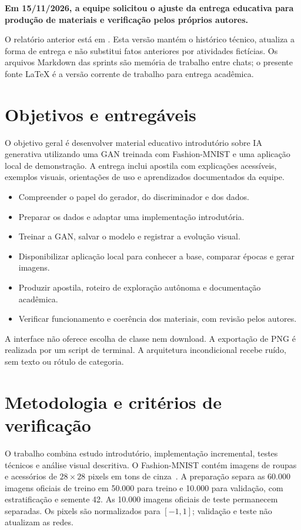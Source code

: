 \documentclass[12pt,a4paper]{article}
\begin{document}
\textbf{Em 15/11/2026, a equipe solicitou o ajuste da entrega educativa para produção de materiais e verificação pelos próprios autores.}

O relatório anterior está em . Esta versão mantém o histórico técnico, atualiza a forma de entrega e não substitui fatos anteriores por atividades fictícias. Os arquivos Markdown das sprints são memória de trabalho entre chats; o presente fonte LaTeX é a versão corrente de trabalho para entrega acadêmica.

\section{Objetivos e entregáveis}
O objetivo geral é desenvolver material educativo introdutório sobre IA generativa utilizando uma GAN treinada com Fashion-MNIST e uma aplicação local de demonstração. A entrega inclui apostila com explicações acessíveis, exemplos visuais, orientações de uso e aprendizados documentados da equipe.
\begin{itemize}
\item Compreender o papel do gerador, do discriminador e dos dados.
\item Preparar os dados e adaptar uma implementação introdutória.
\item Treinar a GAN, salvar o modelo e registrar a evolução visual.
\item Disponibilizar aplicação local para conhecer a base, comparar épocas e gerar imagens.
\item Produzir apostila, roteiro de exploração autônoma e documentação acadêmica.
\item Verificar funcionamento e coerência dos materiais, com revisão pelos autores.
\end{itemize}
A interface não oferece escolha de classe nem download. A exportação de PNG é realizada por um script de terminal. A arquitetura incondicional recebe ruído, sem texto ou rótulo de categoria.

\section{Metodologia e critérios de verificação}
O trabalho combina estudo introdutório, implementação incremental, testes técnicos e análise visual descritiva. O Fashion-MNIST contém imagens de roupas e acessórios de $28\times28$ pixels em tons de cinza~\cite{fashionmnist}. A preparação separa as 60.000 imagens oficiais de treino em 50.000 para treino e 10.000 para validação, com estratificação e semente 42. As 10.000 imagens oficiais de teste permanecem separadas. Os pixels são normalizados para $[-1,1]$; validação e teste não atualizam as redes.
\end{document}
